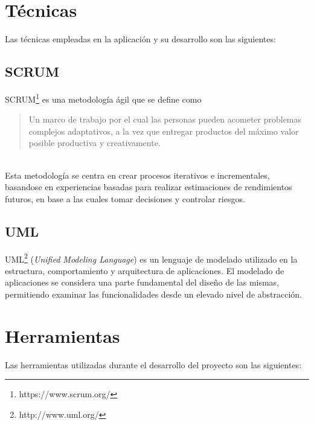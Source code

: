
\section{Técnicas}
Las técnicas empleadas en la aplicación y su desarrollo son las siguientes:

\subsection{SCRUM}
SCRUM\footnote{https://www.scrum.org/} es una metodología ágil que se define como
\begin{quote}
Un marco de trabajo por el cual las personas pueden acometer problemas complejos 
adaptativos, a la vez que entregar productos del máximo valor posible productiva y 
creativamente\cite{scrum}.
\end{quote}
\\
Esta metodología se centra en crear procesos iterativos e incrementales, basandose en experiencias basadas para realizar estimaciones de rendimientos futuros, en base a las cuales tomar decisiones y controlar riesgos.

\subsection{UML}
UML\footnote{http://www.uml.org/} (\emph{Unified Modeling Language}) es un lenguaje de modelado utilizado en la estructura, comportamiento y arquitectura de aplicaciones.
El modelado de aplicaciones se considera una parte fundamental del diseño de las mismas, permitiendo examinar las funcionalidades desde un elevado nivel de abstracción.

\section{Herramientas}
Las herramientas utilizadas durante el desarrollo del proyecto son las siguientes:

